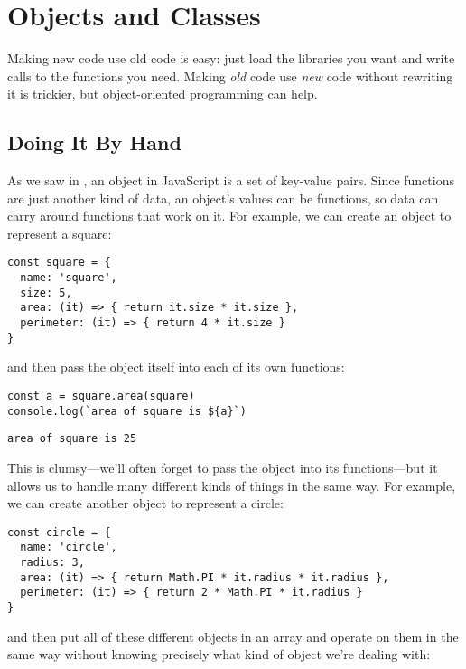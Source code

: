 \chapter{Objects and Classes}\label{s:oop}

Making new code use old code is easy:
just load the libraries you want and write calls to the functions you need.
Making \emph{old} code use \emph{new} code without rewriting it is trickier,
but object-oriented programming can help.

\section{Doing It By Hand}\label{s:oop-manual}

As we saw in ,
an object in JavaScript is a set of key-value pairs.
Since functions are just another kind of data,
an object's values can be functions,
so data can carry around functions that work on it.
For example,
we can create an object to represent a square:

\begin{verbatim}
const square = {
  name: 'square',
  size: 5,
  area: (it) => { return it.size * it.size },
  perimeter: (it) => { return 4 * it.size }
}
\end{verbatim}

\noindent
and then pass the object itself into each of its own functions:

\begin{verbatim}
const a = square.area(square)
console.log(`area of square is ${a}`)
\end{verbatim}

\begin{verbatim}
area of square is 25
\end{verbatim}

This is clumsy---we'll often forget to pass the object into its functions---but
it allows us to handle many different kinds of things in the same way.
For example,
we can create another object to represent a circle:

\begin{verbatim}
const circle = {
  name: 'circle',
  radius: 3,
  area: (it) => { return Math.PI * it.radius * it.radius },
  perimeter: (it) => { return 2 * Math.PI * it.radius }
}
\end{verbatim}

\noindent
and then put all of these different objects in an array
and operate on them in the same way
without knowing precisely what kind of object we're dealing with:

